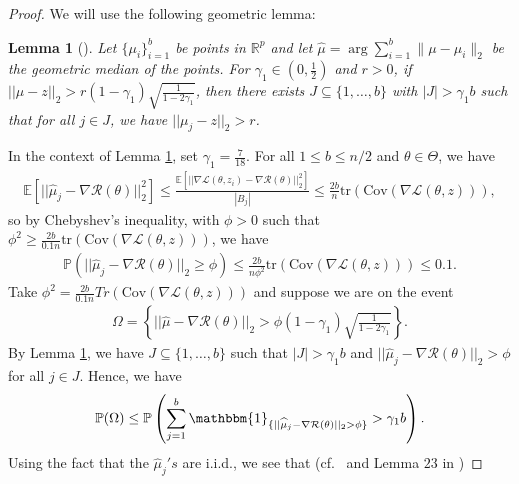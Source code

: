 \documentclass{article}
\newtheorem{lemma}{Lemma}
\begin{document}
\begin{proof}

We will use the following geometric lemma:

\begin{lemma}[\cite{Minsker}]
\label{lemma:6}
Let $\{\mu_i\}_{i = 1}^b$ be points in $\mathbb{R}^p$ and let $\widehat{\mu} = \mathop{\arg \min\limits_{\mu}} \sum_{i=1}^{b} \| \mu - \mu_i \|_2$ be the geometric median of the points. For $\gamma_1 \in \left(0, \frac{1}{2}\right)$ and $r > 0$, if $||\widehat{\mu} - z||_2 > r(1 - \gamma_1)\sqrt{\frac{1}{1 - 2\gamma_1}}$, then there exists $J \subseteq \{1, \dots, b\}$ with $|J| > \gamma_1 b$ such that for all $j \in J$, we have $||\mu_j - z||_2 > r$.
\end{lemma}

In the context of Lemma \ref{lemma:6}, set $\gamma_1 = \frac{7}{18}$. For all $1 \leq b \leq n/2$ and $\theta \in \Theta$, we have
\begin{align*}
\mathbb{E}\left[||\widehat{\mu}_j - \nabla\mathcal{R}(\theta)||_2^2\right] \leq \frac{\mathbb{E}\left[||\nabla \mathcal{L}(\theta, z_i) - \nabla\mathcal{R}(\theta)||_2^2\right]}{|B_j|} \leq \frac{2b}{n}\mbox{tr}(\mathrm{\mathrm{Cov}}(\nabla \mathcal{L}(\theta, z))),
\end{align*}
so by Chebyshev's inequality, with $\phi >0$ such that $\phi^2 \geq \frac{2b}{0.1n}\mbox{tr}(\mathrm{\mathrm{Cov}}(\nabla \mathcal{L}(\theta, z)))$, we have
\begin{align*}
\mathbb{P}\left(||\widehat{\mu}_j - \nabla\mathcal{R}(\theta)||_2 \geq \phi \right) \leq \frac{2b}{n\phi^2}\mbox{tr}(\mathrm{\mathrm{Cov}}(\nabla \mathcal{L}(\theta, z))) \leq 0.1.
\end{align*}
Take $\phi^2 = \frac{2b}{0.1n}Tr(\mathrm{\mathrm{Cov}}(\nabla \mathcal{L}(\theta, z)))$ and suppose we are on the event
\begin{align*}
\Omega = \left\{||\widehat{\mu} - \nabla\mathcal{R}(\theta)||_2 > \phi (1 - \gamma_1)\sqrt{\frac{1}{1 - 2\gamma_1}}\right\}.
\end{align*}
By Lemma \ref{lemma:6}, we have $J \subseteq \{1, \dots, b\}$ such that $|J| > \gamma_1 b$ and $||\widehat{\mu}_j - \nabla\mathcal{R}(\theta)||_2 > \phi$ for all $j \in J$. Hence, we have
\begin{align*}
\mathbb{P}(\Omega) \leq \mathbb{P}\left(\sum_{j = 1}^b \mathbbm{1}_{\{||\widehat{\mu}_j - \nabla\mathcal{R}(\theta)||_2 > \phi\}} > \gamma_1 b\right).
\end{align*}
Using the fact that the $\widehat{\mu}_j's$ are i.i.d., we see that (cf.\ \cite{Minsker} and Lemma $23$ in \cite{Lera})

\end{proof}
\end{document}
